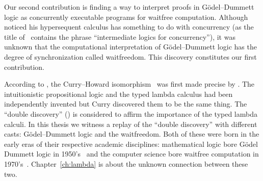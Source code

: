 Our second contribution is finding a way to interpret proofs in
G\"odel--Dummett logic as
concurrently executable programs for waitfree computation.
Although \citet{avron91} noticed his hypersequent calculus has something
to do with concurrency (as the title of~\citep{avron91} contains the phrase
``intermediate logics for concurrency''), it was unknown that
the computational interpretation of G\"odel--Dummett logic has
the degree of synchronization called waitfreedom.  This discovery
constitutes our first contribution.

According to \citet[p.97]{curryhoward},
the Curry--Howard isomorphism~\citep{curryhoward} was first made
precise by \citet[\textbf{9}E and
\textbf{9}F]{curry1974combinatory}.
The intuitionistic propositional logic and the typed lambda calculus
had been independently invented but Curry discovered them to be the same thing.
The ``double discovery'' (\citet{wadler2012propositions}) is considered
to affirm the importance of the typed lambda calculi.
In this thesis we witness a replay of the ``double discovery'' with
different casts: G\"odel--Dummett logic and the waitfreedom.
Both of these were born in the early eras of their respective academic
disciplines:
mathematical logic bore G\"odel Dummett logic in
1950's~\citep{dummett59}
and the computer science bore waitfree computation in
1970's~\citep{lamport1979make}.
Chapter~\ref{ch:lambda} is about the unknown connection between these two.

